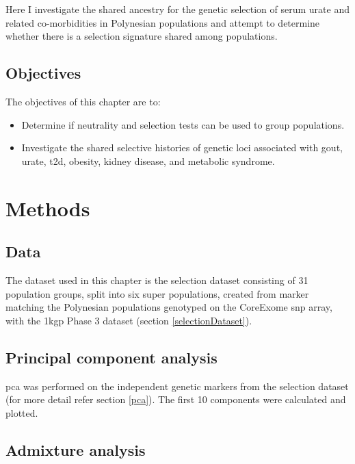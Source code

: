 \documentclass[]{report}
\providecommand{\tightlist}{%
  \setlength{\itemsep}{0pt}\setlength{\parskip}{0pt}}
\begin{document}
Here I investigate the shared ancestry for the genetic selection of
serum urate and related co-morbidities in Polynesian populations and
attempt to determine whether there is a selection signature shared among
populations.

\subsection{Objectives}\label{objectives-1}

The objectives of this chapter are to:

\begin{itemize}
\tightlist
\item
  Determine if neutrality and selection tests can be used to group
  populations.
\item
  Investigate the shared selective histories of genetic loci associated
  with gout, urate, \gls{t2d}, obesity, kidney disease, and metabolic
  syndrome.
\end{itemize}

\section{Methods}\label{methods-1}

\subsection{Data}\label{data}

The dataset used in this chapter is the selection dataset consisting of
31 population groups, split into six super populations, created from
marker matching the Polynesian populations genotyped on the CoreExome
\gls{snp} array, with the \gls{1kgp} Phase 3 dataset (section
\ref{selectionDataset}).

\subsection{Principal component
analysis}\label{principal-component-analysis}

\Glsdesc{pca} was performed on the independent genetic markers from the
selection dataset (for more detail refer section \ref{pca}). The first
10 components were calculated and plotted.

\subsection{Admixture analysis}\label{admixture-analysis}
\end{document}
